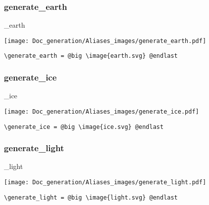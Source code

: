 \documentclass{article}
\begin{document}
\subsubsection{generate\_earth}
\begin{minipage}{0.45\linewidth}
\raggedright
\begin{spverbatim}
\generate_earth
\end{spverbatim}
\end{minipage}
\begin{minipage}{0.45\linewidth}
\raggedleft
\texttt{[image: Doc\_generation/Aliases\_images/generate\_earth.pdf]}
\end{minipage}
\begin{center}
\begin{BVerbatim}
\generate_earth = @big \image{earth.svg} @endlast
\end{BVerbatim}
\end{center}

\subsubsection{generate\_ice}
\begin{minipage}{0.45\linewidth}
\raggedright
\begin{spverbatim}
\generate_ice
\end{spverbatim}
\end{minipage}
\begin{minipage}{0.45\linewidth}
\raggedleft
\texttt{[image: Doc\_generation/Aliases\_images/generate\_ice.pdf]}
\end{minipage}
\begin{center}
\begin{BVerbatim}
\generate_ice = @big \image{ice.svg} @endlast
\end{BVerbatim}
\end{center}

\subsubsection{generate\_light}
\begin{minipage}{0.45\linewidth}
\raggedright
\begin{spverbatim}
\generate_light
\end{spverbatim}
\end{minipage}
\begin{minipage}{0.45\linewidth}
\raggedleft
\texttt{[image: Doc\_generation/Aliases\_images/generate\_light.pdf]}
\end{minipage}
\begin{center}
\begin{BVerbatim}
\generate_light = @big \image{light.svg} @endlast
\end{BVerbatim}
\end{center}
\end{document}
